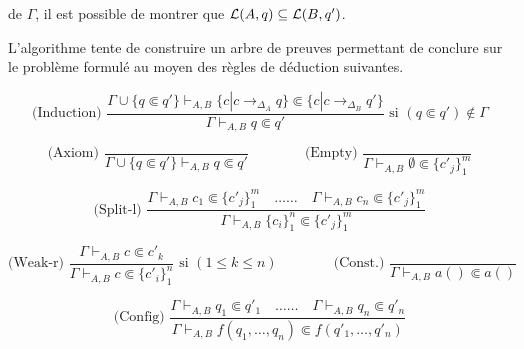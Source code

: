 de $\Gamma$,  il est possible de montrer que $\mathcal{L}(A,q) \subseteq \mathcal{L}(B,q')$.

L'algorithme tente de construire un arbre de preuves permettant de conclure sur le problème
formulé au moyen des règles de déduction suivantes.


{\small
\[\textrm{(Induction) }
\dfrac{
  \Gamma \cup \{q \Subset q'\} \vdash_{A, B}
  \{c|c \rightarrow_{\Delta_A} q\} \Subset \{c|c \rightarrow_{\Delta_B} q'\}
}{
  \Gamma \vdash_{A, B} q \Subset q'
}\textrm{  si }(q \Subset q') \notin \Gamma
\]


\[\textrm{(Axiom) }
\dfrac{}{
  \Gamma \cup \{q \Subset q'\} \vdash_{A, B} q \Subset q'
}\quad \quad \quad \quad 
\textrm{(Empty) }
\dfrac{}{
  \Gamma \vdash_{A, B} \emptyset \Subset \{c'_j\}^m_1
}
\]



\[\textrm{(Split-l) }
\dfrac {
  \Gamma \vdash_{A, B} c_1 \Subset \{c'_j\}^m_1 \quad \dots\dots \quad
  \Gamma \vdash_{A, B}  c_n \Subset \{c'_j\}^m_1
}{
  \Gamma \vdash_{A, B} \{c_i\}^n_1 \Subset \{c'_j\}^m_1
}\]


\[\textrm{(Weak-r) }
\dfrac{
  \Gamma \vdash_{A, B} c \Subset c'_k
}{
  \Gamma \vdash_{A, B} c \Subset \{c'_i\}^n_1
}\textrm{ si }(1 \le k \le n)
\quad\quad\quad \quad
\textrm{(Const.) }
\dfrac{}{
  \Gamma \vdash_{A, B} a() \Subset a()
}
\]

\[\textrm{(Config) }
\dfrac{
  \Gamma \vdash_{A, B} q_1 \Subset q'_1 \quad \dots\dots \quad \Gamma \vdash_{A, B} q_n \Subset q'_n
}{
  \Gamma \vdash_{A, B} f(q_1, \dots, q_n) \Subset f(q'_1, \dots, q'_n)
}\]

}
\noindent

